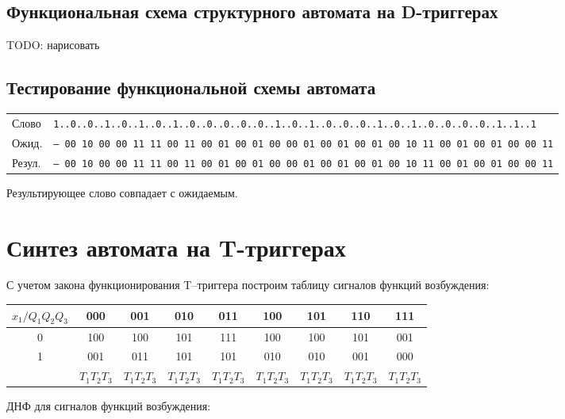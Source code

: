 \documentclass[12pt, a4paper]{article}
\begin{document}
\subsection*{Функциональная схема структурного автомата на D-триггерах}

TODO: нарисовать

\subsection*{Тестирование функциональной схемы автомата}

\begin{center}
  \begin{tabular}{| l  l |}
    \hline
    Слово & \footnotesize{\texttt{1..0..0..1..0..1..0..1..0..0..0..0..0..1..0..1..0..0..0..1..0..1..0..0..0..0..1..1..1}}\\
    Ожид. & \footnotesize{\texttt{-- 00 10 00 00 11 11 00 11 00 01 00 01 00 00 01 00 01 00 01 00 10 11 00 01 00 01 00 00 11}}\\
    Резул. & \footnotesize{\texttt{-- 00 10 00 00 11 11 00 11 00 01 00 01 00 00 01 00 01 00 01 00 10 11 00 01 00 01 00 00 11}}\\\hline
  \end{tabular}
\end{center}

Результирующее слово совпадает с ожидаемым.

\section*{Синтез автомата на T-триггерах}

С учетом закона функционирования T–триггера построим таблицу сигналов функций возбуждения:

\begin{tabular}{|*{9}{c|}}
  \hline
  $x_1/Q_1Q_2Q_3$ & 000 & 001 & 010 & 011 & 100 & 101 & 110 & 111\\\hline
  0 & 100 & 100 & 101 & 111 & 100 & 100 & 101 & 001\\\hline
  1 & 001 & 011 & 101 & 101 & 010 & 010 & 001 & 000\\\hline
   & $T_1T_2T_3$ & $T_1T_2T_3$ & $T_1T_2T_3$ & $T_1T_2T_3$ & $T_1T_2T_3$ & $T_1T_2T_3$ & $T_1T_2T_3$ & $T_1T_2T_3$\\\hline
\end{tabular}

ДНФ для сигналов функций возбуждения:
\end{document}
